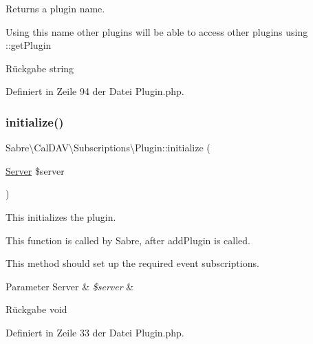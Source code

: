 Returns a plugin name.

Using this name other plugins will be able to access other plugins using \+::get\+Plugin

\begin{DoxyReturn}{Rückgabe}
string 
\end{DoxyReturn}


Definiert in Zeile 94 der Datei Plugin.\+php.

\mbox{\label{class_sabre_1_1_cal_d_a_v_1_1_subscriptions_1_1_plugin_accf9fe37641939ea1d2557f45a21ae1b}} 
\subsubsection{\texorpdfstring{initialize()}{initialize()}}
{\footnotesize\ttfamily Sabre\textbackslash{}\+Cal\+D\+A\+V\textbackslash{}\+Subscriptions\textbackslash{}\+Plugin\+::initialize (\begin{DoxyParamCaption}\item[{\mbox{\hyperlink{class_sabre_1_1_d_a_v_1_1_server}{Server}}}]{\$server }\end{DoxyParamCaption})}

This initializes the plugin.

This function is called by Sabre, after add\+Plugin is called.

This method should set up the required event subscriptions.


\begin{DoxyParams}[1]{Parameter}
Server & {\em \$server} & \\
\hline
\end{DoxyParams}
\begin{DoxyReturn}{Rückgabe}
void 
\end{DoxyReturn}


Definiert in Zeile 33 der Datei Plugin.\+php.

\mbox{\label{class_sabre_1_1_cal_d_a_v_1_1_subscriptions_1_1_plugin_a3865b70ee78dc11b003e28cbf4343812}} 
